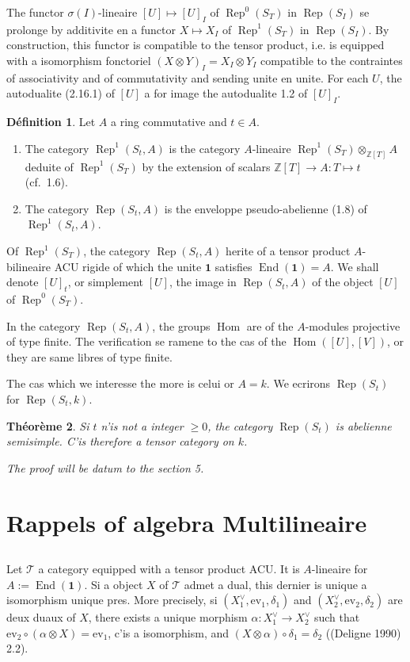 \documentclass[11pt,a4paper]{article}
\theoremstyle{plain}
\newtheorem{theorem}{Th\'eor\`eme}[section]
\theoremstyle{definition}
\newtheorem{definition}[theorem]{D\'efinition}
\DeclareMathOperator{\Hom}{Hom}
\DeclareMathOperator{\End}{End}
\DeclareMathOperator{\Rep}{Rep}
\newcommand{\Z}{\mathbb{Z}}
\newcommand{\ev}{\mathrm{ev}}
\begin{document}
The functor $\sigma(I)$-lineaire $[U] \mapsto [U]_I$ of $\Rep^0(S_T)$ in $\Rep(S_I)$ se prolonge by additivite en a functor $X \mapsto X_I$ of $\Rep^1(S_T)$ in $\Rep(S_I)$. By construction, this functor is compatible to the tensor product, i.e. is equipped with a isomorphism fonctoriel $(X \otimes Y)_I = X_I \otimes Y_I$ compatible to the contraintes of associativity and of commutativity and sending unite en unite. For each $U$, the autodualite (2.16.1) of $[U]$ a for image the autodualite 1.2 of $[U]_I$.

\begin{definition}
Let $A$ a ring commutative and $t \in A$.
\begin{enumerate}[label=(\roman*)]
\item The category $\Rep^1(S_t, A)$ is the category $A$-lineaire $\Rep^1(S_T) \otimes_{\Z[T]} A$ deduite of $\Rep^1(S_T)$ by the extension of scalars $\Z[T] \to A : T \mapsto t$ (cf.~1.6).
\item The category $\Rep(S_t, A)$ is the enveloppe pseudo-abelienne (1.8) of $\Rep^1(S_t, A)$.
\end{enumerate}

Of $\Rep^1(S_T)$, the category $\Rep(S_t, A)$ herite of a tensor product $A$-bilineaire ACU rigide of which the unite $\mathbf{1}$ satisfies $\End(\mathbf{1}) = A$. We shall denote $[U]_t$, or simplement $[U]$, the image in $\Rep(S_t, A)$ of the object $[U]$ of $\Rep^0(S_T)$.

In the category $\Rep(S_t, A)$, the groups $\Hom$ are of the $A$-modules projective of type finite. The verification se ramene to the cas of the $\Hom([U], [V])$, or they are same libres of type finite.
\end{definition}

The cas which we interesse the more is celui or $A = k$. We ecrirons $\Rep(S_t)$ for $\Rep(S_t, k)$.

\begin{theorem}
Si $t$ n'is not a integer $\geq 0$, the category $\Rep(S_t)$ is abelienne semisimple. C'is therefore a tensor category on $k$.

The proof will be datum to the section 5.
\end{theorem}


\section{Rappels of algebra Multilineaire}

\subsection{}
Let $\mathcal{T}$ a category equipped with a tensor product ACU. It is $A$-lineaire for $A := \End(\mathbf{1})$. Si a object $X$ of $\mathcal{T}$ admet a dual, this dernier is unique a isomorphism unique pres. More precisely, si $(X_1^\vee, \ev_1, \delta_1)$ and $(X_2^\vee, \ev_2, \delta_2)$ are deux duaux of $X$, there exists a unique morphism $\alpha : X_1^\vee \to X_2^\vee$ such that $\ev_2 \circ (\alpha \otimes X) = \ev_1$, c'is a isomorphism, and $(X \otimes \alpha) \circ \delta_1 = \delta_2$ ((Deligne 1990) 2.2).
\end{document}
